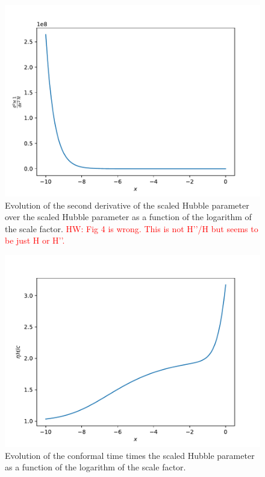 \documentclass{aa}
\newcommand{\hw}[1]{\textcolor{red}{HW: #1}}
\begin{document}
\begin{figure}[ht]
\centering
\includegraphics[width=\hsize]{figures/ddHpddx_over_Hp.pdf}
  \caption{Evolution of the second derivative of the scaled Hubble parameter over the scaled Hubble parameter as a function of the logarithm of the scale factor. \hw{Fig 4 is wrong. This is not H’’/H but seems to be just H or H’’.}}
     \label{fig:ddhpddx}
\end{figure}

\begin{figure}[ht]
\centering
\includegraphics[width=\hsize]{figures/etaHp_over_c.pdf}
  \caption{Evolution of the conformal time times the scaled Hubble parameter as a function of the logarithm of the scale factor.}
     \label{fig:eta}
\end{figure}
\end{document}
